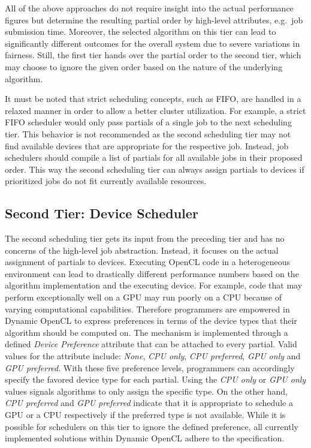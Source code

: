 All of the above approaches do not require insight into the actual performance figures but determine the resulting partial order by high-level attributes, e.g.~job submission time. Moreover, the selected algorithm on this tier can lead to significantly different outcomes for the overall system due to severe variations in fairness. Still, the first tier hands over the partial order to the second tier, which may choose to ignore the given order based on the nature of the underlying algorithm.

It must be noted that strict scheduling concepts, such as FIFO, are handled in a relaxed manner in order to allow a better cluster utilization. For example, a strict FIFO scheduler would only pass partials of a single job to the next scheduling tier. This behavior is not recommended as the second scheduling tier may not find available devices that are appropriate for the respective job. Instead, job schedulers should compile a list of partials for all available jobs in their proposed order. This way the second scheduling tier can always assign partials to devices if prioritized jobs do not fit currently available resources.

\subsection{Second Tier: Device Scheduler}
The second scheduling tier gets its input from the preceding tier and has no concerns of the high-level job abstraction. Instead, it focuses on the actual assignment of partials to devices. Executing OpenCL code in a heterogeneous environment can lead to drastically different performance numbers based on the algorithm implementation and the executing device. For example, code that may perform exceptionally well on a GPU may run poorly on a CPU because of varying computational capabilities. Therefore programmers are empowered in Dynamic OpenCL to express preferences in terms of the device types that their algorithm should be computed on. The mechanism is implemented through a defined \textit{Device Preference} attribute that can be attached to every partial. Valid values for the attribute include: \textit{None}, \textit{CPU only}, \textit{CPU preferred}, \textit{GPU only} and \textit{GPU preferred}. With these five preference levels, programmers can accordingly specify the favored device type for each partial. Using the \textit{CPU only} or \textit{GPU only} values signals algorithms to only assign the specific type. On the other hand, \textit{CPU preferred} and \textit{GPU preferred} indicate that it is appropriate to schedule a GPU or a CPU respectively if the preferred type is not available. While it is possible for schedulers on this tier to ignore the defined preference, all currently implemented solutions within Dynamic OpenCL adhere to the specification.


